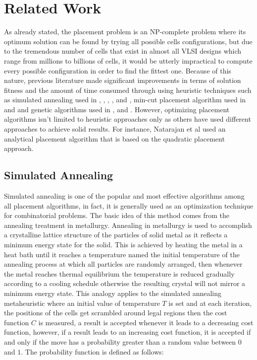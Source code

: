 \documentclass[conference]{IEEEtran}
\begin{document}
\section{Related Work}

As already stated, the placement problem is an NP-complete problem where its optimum solution can be found by trying all possible cells configurations, but due to the tremendous number of cells that exist in almost all VLSI designs which range from millions to billions of cells, it would be utterly impractical to compute every possible configuration in order to find the fittest one. Because of this nature, previous literature made significant improvements in terms of solution fitness and the amount of time consumed through using heuristic techniques such as simulated annealing used in \cite{b7}, \cite{b10}, \cite{b11}, \cite{b12}, \cite{b13} and \cite{b14}, min-cut placement algorithm used in \cite{b1} and \cite{b15} and genetic algorithms used in \cite{b2}, \cite{b3} and \cite{b7}. However, optimizing placement algorithms isn't limited to heuristic approaches only as others have used different approaches to achieve solid results. For instance, Natarajan et al \cite{b8} used an analytical placement algorithm that is based on the quadratic placement approach.

\subsection{Simulated Annealing}

Simulated annealing is one of the popular and most effective algorithms among all placement algorithms, in fact, it is generally used as an optimization technique for combinatorial problems. The basic idea of this method comes from the annealing treatment in metallurgy. Annealing in metallurgy is used to accomplish a crystalline lattice structure of the particles of solid metal as it reflects a minimum energy state for the solid. This is achieved by heating the metal in a heat bath until it reaches a temperature named the initial temperature of the annealing process at which all particles are randomly arranged, then whenever the metal reaches thermal equilibrium the temperature is reduced gradually according to a cooling schedule otherwise the resulting crystal will not mirror a minimum energy state. This analogy applies to the simulated annealing metaheuristic where an initial value of temperature $T$ is set and at each iteration, the positions of the cells get scrambled around legal regions then the cost function $C$ is measured, a result is accepted whenever it leads to a decreasing cost function, however, if a result leads to an increasing cost function, it is accepted if and only if the move has a probability greater than a random value between $0$ and $1$. The probability function is defined as follows:
\end{document}
